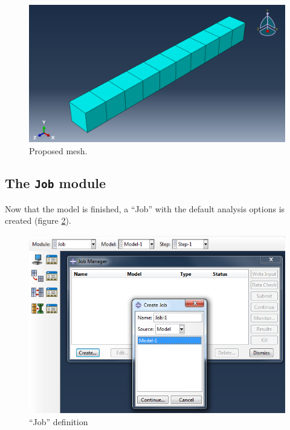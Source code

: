 \documentclass[spanish,a4paper,12pt]{article}
\begin{document}
\begin{figure}[h!tp]
\centering
\includegraphics[scale=0.4]{capturas/mesh2.png}
\caption{Proposed mesh.}
\label{fig:mesh2}%
\end{figure}

\clearpage
\subsection{The \texttt{Job} module}

Now that the model is finished, a ``Job'' with the default analysis options is created
(figure \ref{fig:job-create}).
\begin{figure}[h!tp]
\centering
\includegraphics[scale=0.5]{capturas/37-job.png}
\caption{``Job'' definition}
\label{fig:job-create}
\end{figure}
\end{document}
